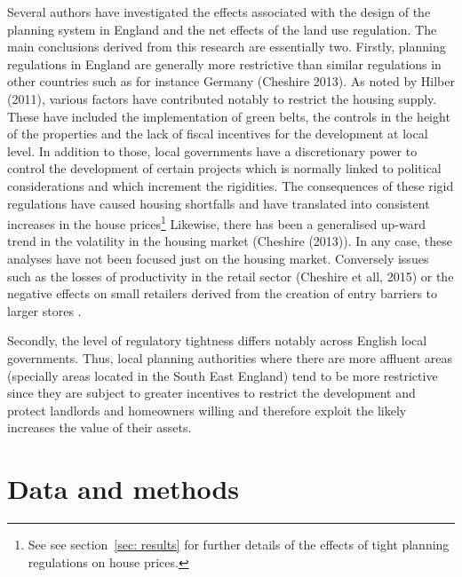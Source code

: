 \documentclass[12pt,letterpaper]{article}
\begin{document}
Several authors have investigated the effects associated with the design of the planning system in England 
and the net effects of the land use regulation. The main conclusions derived from this research are essentially
 two. Firstly, planning regulations in England are generally more restrictive than similar regulations in other
  countries such as for instance Germany (Cheshire 2013). As noted by Hilber (2011),
   various factors have contributed notably to restrict the housing supply. These have
    included the implementation of green belts, the controls in the height of the
     properties and the lack of fiscal incentives for the development at local level.
      In addition to those, local governments have a discretionary power to control
       the development of certain projects which is normally linked to political considerations
        and which increment the rigidities. The consequences of these rigid regulations have
         caused housing shortfalls \citep{cheshire2009, cheshire2014, hilber2016supply }
          and have translated into consistent increases in the house prices\footnote{See 
          see section~\ref{sec: results}
          for further details of the effects of tight planning regulations on house prices.} 
          Likewise, there has been a generalised up-ward trend in the volatility in the
           housing market (Cheshire (2013)). In any case, these analyses have not
            been focused just on the housing market. Conversely issues such as
             the losses of productivity in the retail sector (Cheshire et all, 2015)
              or the negative effects on small retailers derived from the creation
               of entry barriers to larger stores \cite{sadun2015}.  
               
               Secondly, the level of regulatory tightness differs notably across
                English local governments. Thus, local planning authorities
                 where there are more affluent areas (specially areas located in the South East England) 
                 tend to be more restrictive since they are subject to greater incentives to restrict 
                 the development and protect landlords and homeowners willing and therefore
                  exploit the likely increases the value of their assets. 
  

\section{Data and methods}
\label{sec: data}
\end{document}
